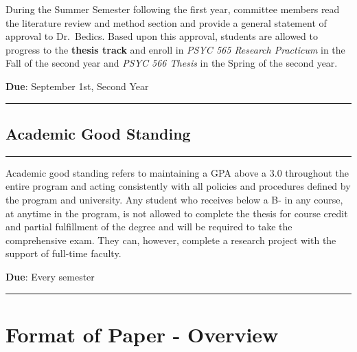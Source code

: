 \documentclass[openany]{book}
\begin{document}
During the Summer Semester following the first year, committee members read the literature review and method section and provide a general statement of approval to Dr.~Bedics. Based upon this approval, students are allowed to progress to the \textbf{thesis track} and enroll in \emph{PSYC 565 Research Practicum} in the Fall of the second year and \emph{PSYC 566 Thesis} in the Spring of the second year.

\textbf{Due}: September 1st, Second Year

\begin{center}\rule{0.5\linewidth}{0.5pt}\end{center}

\hypertarget{academic-good-standing}{%
\section{Academic Good Standing}\label{academic-good-standing}}

\begin{center}\rule{0.5\linewidth}{0.5pt}\end{center}

Academic good standing refers to maintaining a GPA above a 3.0 throughout the entire program and acting consistently with all policies and procedures defined by the program and university. Any student who receives below a B- in any course, at anytime in the program, is not allowed to complete the thesis for course credit and partial fulfillment of the degree and will be required to take the comprehensive exam. They can, however, complete a research project with the support of full-time faculty.

\textbf{Due}: Every semester

\begin{center}\rule{0.5\linewidth}{0.5pt}\end{center}

\hypertarget{format-of-paper---overview}{%
\chapter{Format of Paper - Overview}\label{format-of-paper---overview}}
\end{document}
